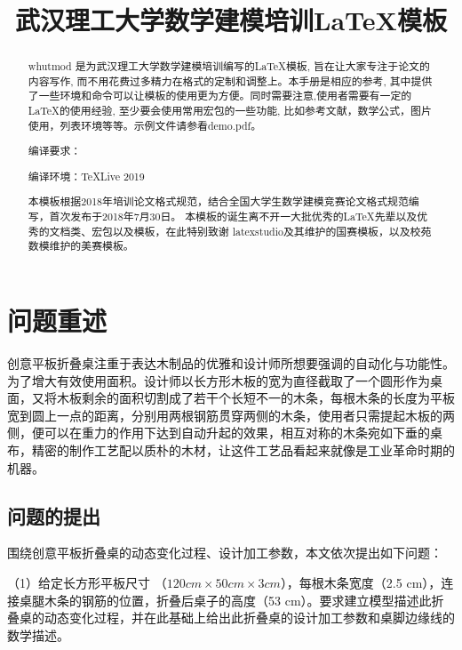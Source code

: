 \documentclass{whutmod}
\title{武汉理工大学数学建模培训\LaTeX 模板}
\begin{document}
\maketitle

\begin{abstract}
	whutmod 是为武汉理工大学数学建模培训编写的\LaTeX 模板, 旨在让大家专注于论文的内容写作, 而不用花费过多精力在格式的定制和调整上。本手册是相应的参考, 其中提供了一些环境和命令可以让模板的使用更为方便。同时需要注意,使用者需要有一定的\LaTeX 的使用经验, 至少要会使用常用宏包的一些功能, 比如参考文献，数学公式，图片使用，列表环境等等。示例文件请参看demo.pdf。
	
	编译要求：\XeLaTeX
	
	编译环境：\TeX Live 2019
	
	本模板根据2018年培训论文格式规范，结合全国大学生数学建模竞赛论文格式规范编写，首次发布于2018年7月30日。
	本模板的诞生离不开一大批优秀的\LaTeX 先辈以及优秀的文档类、宏包以及模板，在此特别致谢 latexstudio及其维护的国赛模板，以及校苑数模维护的美赛模板。
	
\end{abstract}

\tableofcontents
\newpage

\section{问题重述}

创意平板折叠桌注重于表达木制品的优雅和设计师所想要强调的自动化与功能性。为了增大有效使用面积。设计师以长方形木板的宽为直径截取了一个圆形作为桌面，又将木板剩余的面积切割成了若干个长短不一的木条，每根木条的长度为平板宽到圆上一点的距离，分别用两根钢筋贯穿两侧的木条，使用者只需提起木板的两侧，便可以在重力的作用下达到自动升起的效果，相互对称的木条宛如下垂的桌布，精密的制作工艺配以质朴的木材，让这件工艺品看起来就像是工业革命时期的机器。

\subsection{问题的提出}

围绕创意平板折叠桌的动态变化过程、设计加工参数，本文依次提出如下问题：

（1）给定长方形平板尺寸 （$120 cm \times 50 cm \times 3 cm$），每根木条宽度（2.5 cm），连接桌腿木条的钢筋的位置，折叠后桌子的高度（53 cm）。要求建立模型描述此折叠桌的动态变化过程，并在此基础上给出此折叠桌的设计加工参数和桌脚边缘线的数学描述。
\end{document}
